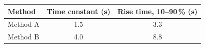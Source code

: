 \par
\begin{tabular}{@{}lcc@{}}
  \toprule
  Method & Time constant (s) & Rise time, 10--90\,\% (s) \\
  \midrule
  Method A & 1.5 & 3.3 \\
  Method B & 4.0 & 8.8 \\
  \bottomrule
\end{tabular}
\par
